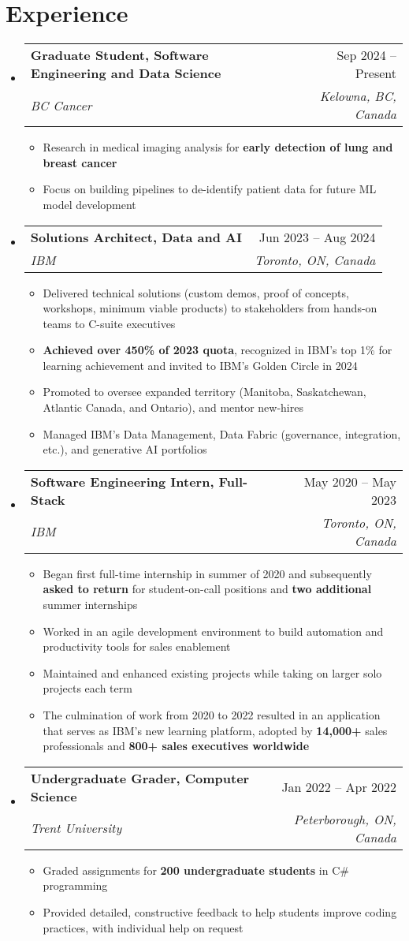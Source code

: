 \documentclass[letterpaper,11.5pt]{article}
\makeatletter
\newcommand{\resumeItem}[1]{
  \item\small{
    {#1 \vspace{-2pt}}
  }
}
\newcommand{\resumeSubheading}[4]{
  \vspace{-2pt}\item
    \begin{tabular*}{0.97\textwidth}[t]{l@{\extracolsep{\fill}}r}
      \textbf{#1} & #2 \\
      \textit{\small#3} & \textit{\small #4} \\
    \end{tabular*}\vspace{-7pt}
}
\newcommand{\resumeSubHeadingListStart}{\begin{itemize}[leftmargin=0.15in, label={}]}
\newcommand{\resumeSubHeadingListEnd}{\end{itemize}}
\newcommand{\resumeItemListStart}{\begin{itemize}}
\newcommand{\resumeItemListEnd}{\end{itemize}\vspace{-5pt}}
\makeatother
\begin{document}
\section{Experience}
  \resumeSubHeadingListStart
    \resumeSubheading
      {Graduate Student, Software Engineering and Data Science}{Sep 2024 -- Present}
      {BC Cancer}{Kelowna, BC, Canada}
      \resumeItemListStart
        \resumeItem{Research in medical imaging analysis for \textbf{early detection of lung and breast cancer}}
        \resumeItem{Focus on building pipelines to de-identify patient data for future ML model development}
      \resumeItemListEnd
    \resumeSubheading
      {Solutions Architect, Data and AI}{Jun 2023 -- Aug 2024}
      {IBM}{Toronto, ON, Canada}
      \resumeItemListStart
        \resumeItem{Delivered technical solutions (custom demos, proof of concepts, workshops, minimum viable products) to stakeholders from hands-on teams to C-suite executives}
        \resumeItem{\textbf{Achieved over 450\% of 2023 quota}, recognized in IBM's top 1\% for learning achievement and invited to IBM's Golden Circle in 2024}
        \resumeItem{Promoted to oversee expanded territory (Manitoba, Saskatchewan, Atlantic Canada, and Ontario), and mentor new-hires}
        \resumeItem{Managed IBM's Data Management, Data Fabric (governance, integration, etc.), and generative AI portfolios}
      \resumeItemListEnd
    \resumeSubheading
      {Software Engineering Intern, Full-Stack}{May 2020 -- May 2023}
      {IBM}{Toronto, ON, Canada}
      \resumeItemListStart
        \resumeItem{Began first full-time internship in summer of 2020 and subsequently \textbf{asked to return} for student-on-call positions and \textbf{two additional} summer internships}
        \resumeItem{Worked in an agile development environment to build automation and productivity tools for sales enablement}
        \resumeItem{Maintained and enhanced existing projects while taking on larger solo projects each term}
        \resumeItem{The culmination of work from 2020 to 2022 resulted in an application that serves as IBM's new learning platform, adopted by \textbf{14,000+} sales professionals and \textbf{800+ sales executives worldwide}}
      \resumeItemListEnd
      \resumeSubheading
      {Undergraduate Grader, Computer Science}{Jan 2022 -- Apr 2022}
      {Trent University}{Peterborough, ON, Canada}
      \resumeItemListStart
        \resumeItem{Graded assignments for \textbf{200 undergraduate students} in C\# programming}
        \resumeItem{Provided detailed, constructive feedback to help students improve coding practices, with individual help on request}
      \resumeItemListEnd
  \resumeSubHeadingListEnd
\end{document}
